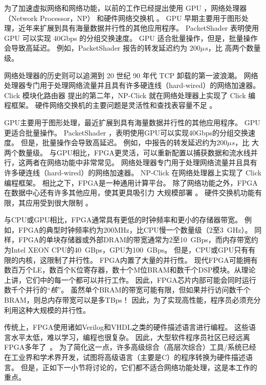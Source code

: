 为了加速虚拟网络和网络功能，以前的工作已经提出使用 GPU \cite {packetshader}，网络处理器（Network Processor，NP） \cite {cavium,netronome} 和硬件网络交换机 \cite {duet}。
GPU 早期主要用于图形处理，近年来扩展到具有海量数据并行性的其他应用程序。
PacketShader \cite {packetshader} 表明使用 GPU 可以实现 40Gbps 的分组交换速度。
GPU 适合批量操作，但是，批量操作会导致高延迟。
例如，PacketShader \cite {packetshader} 报告的转发延迟约为 $200 \mu{}s$，比 \name{} 高两个数量级。

网络处理器的历史则可以追溯到 20 世纪 90 年代 TCP 卸载的第一波浪潮。
网络处理器专门用于处理网络流量并且具有许多硬连线（hard-wired）的网络加速器。
Click 模块化路由器 \cite{kohler2000click} 提出的第二年，NP-Click \cite{shah2004np} 就在网络处理器上实现了 Click 编程框架。
硬件网络交换机的主要问题是灵活性和查找表容量不足 \cite {duet}。


GPU主要用于图形处理，最近扩展到具有海量数据并行性的其他应用程序。 GPU更适合批量操作。 PacketShader \cite {packetshader}，表明使用GPU可以实现40Gbps的分组交换速度。
但是，批量操作会导致高延迟。
例如，\cite {packetshader}中报告的转发延迟约为$200 \mu{}s$，比 \name{} 大两个数量级。
与GPU相比，FPGA更灵活，可以重新配置以捕获数据和流水线并行，这两者在网络功能中非常常见。
网络处理器专门用于处理网络流量并且具有许多硬连线（hard-wired）的网络加速器。
NP-Click \cite{shah2004np} 在网络处理器上实现了 Click 编程框架。
相比之下，FPGA是一种通用计算平台。
除了网络功能之外，FPGA在数据中心还有许多其他应用，使其更具吸引力
大规模部署 \cite {putnam2014reconfigurable}。
硬件交换机功能有限，其应用受到很大限制 \cite {duet}。

与CPU或GPU相比，FPGA通常具有更低的时钟频率和更小的存储器带宽。
例如，FPGA的典型时钟频率约为200MHz，比CPU慢一个数量级（2至3~GHz）。
同样，FPGA的单块存储器或外部DRAM的带宽通常为2至10~GBps，而内存带宽约为Intel XEON CPU的40~GBps，GPU为100~GBps。
但是，CPU或GPU只有有限的内核，这限制了并行性。 FPGA内置了大量的并行性。
现代FPGA可能拥有数百万个LE，数百个K位寄存器，数十个M位BRAM和数千个DSP模块。从理论上讲，它们中的每一个都可以并行工作。
因此，FPGA芯片内部可能会同时运行数千个并行的``\textit {核}''。
虽然单个BRAM的带宽可能有限，但如果并行访问数千个BRAM，则总内存带宽可以是多TBps！
因此，为了实现高性能，程序员必须充分利用这种大规模的并行性。

传统上，FPGA使用诸如Verilog和VHDL之类的硬件描述语言进行编程。
这些语言水平太低，难以学习，编程也很复杂。
因此，大型软件程序员社区已经远离FPGA多年了~\cite {bacon2013fpga}。
为了简化这一点，许多高级综合（高层次综合）工具/系统已经在工业界和学术界开发，试图将高级语言（主要是C）的程序转换为硬件描述语言。
但是，正如下一小节将讨论的，它们都不适合网络功能处理，这是本工作的重点。

